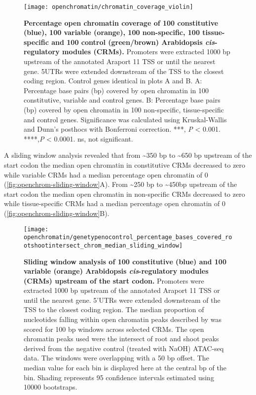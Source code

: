 \documentclass[../main.tex]{subfiles}
\begin{document}
\begin{figure}[hbt!]
	\begin{center}
		\capstart
		\texttt{[image: openchromatin/chromatin\_coverage\_violin]}
		\caption{
			\textbf{Percentage open chromatin coverage of 100 constitutive (blue), 100 variable (orange), 100 non\hyp{}specific, 100 tissue\hyp{}specific and 100 control (green/brown) Arabidopsis \textit{cis}\hyp{}regulatory modules (CRMs).}		
			Promoters were extracted 1000 bp upstream of the annotated Araport 11 \autocite{chengAraport11CompleteReannotation2017} TSS or until the nearest gene.
			5UTRs were extended downstream of the TSS to the closest coding region.
			Control genes identical in plots A and B.	
			A: Percentage base pairs (bp) covered by open chromatin in 100 constitutive, variable and control genes.
			B: Percentage base pairs (bp) covered by open chromatin in 100 non\hyp{}specific, tissue\hyp{}specific and control genes.
			Significance was calculated using Kruskal\hyp{}Wallis and Dunn's posthocs with Bonferroni correction.
			***, \textit{P} \textless{} 0.001. ****,\textit{P} \textless{} 0.0001. ns, not significant.
			\label{fig:chromatin-coverage}
		}
	\end{center}
\end{figure}
A sliding window analysis revealed that from \textasciitilde{}350 bp to \textasciitilde{}650 bp upstream of the start codon the median open chromatin in constitutive CRMs decreased to zero while variable CRMs had a median percentage open chromatin of 0 (\autoref{fig:openchrom-sliding-window}A).
From \textasciitilde{}250 bp to \textasciitilde{}450bp upstream of the start codon the median open chromatin in non\hyp{}specific CRMs decreased to zero while tissue\hyp{}specific  CRMs had a median percentage open chromatin of 0 (\autoref{fig:openchrom-sliding-window}B).

\begin{figure}[!hbt]
	\begin{center}
		\capstart
		\texttt{[image: openchromatin/genetypenocontrol\_percentage\_bases\_covered\_rootshootintersect\_chrom\_median\_sliding\_window]}
		\caption{
			\textbf{Sliding window analysis of 100 constitutive (blue) and 100 variable (orange) Arabidopsis \textit{cis}\hyp{}regulatory modules (CRMs) upstream of the start codon.}
			Promoters were extracted 1000 bp upstream of the annotated Araport 11 \autocite{chengAraport11CompleteReannotation2017} TSS or until the nearest gene.
			5'UTRs were extended downstream of the TSS to the closest coding region.
			The median proportion of nucleotides falling within open chromatin peaks described by \textcite{potterCytokininModulatesContextdependent2018} was scored for 100 bp windows across selected CRMs.
			The open chromatin peaks used were the intersect of root and shoot peaks derived from the negative control (treated with NaOH) ATAC\hyp{}seq data.
			The windows were overlapping with a 50 bp offset.
			The median value for each bin is displayed here at the central bp of the bin.
			Shading represents 95 confidence intervals estimated using 10000 bootstraps.		
			\label{fig:openchrom-sliding-window}
		}
	\end{center}
\end{figure}
\end{document}
